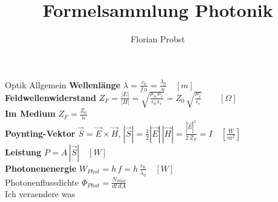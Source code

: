 \documentclass[8pt]{scrartcl}
\author{Florian Probst}
\title{Formelsammlung Photonik}
\begin{document}
	\begin{section}{Optik Allgemein}
		\textbf{Wellenlänge} $\lambda=\frac{c_0}{f\, n} = \frac{\lambda_0}{n}\quad[m]$\\[.2cm]
		\textbf{Feldwellenwiderstand} $Z_F=\frac{|E|}{|H|}=\sqrt{\frac{\mu_0 \, \mu_r}{\epsilon_0 \, \epsilon_r}}= Z_0 \, \sqrt{\frac{\mu_r}{\epsilon_r}} \qquad[\Omega]$\\[.2cm]
		\textbf{Im Medium} $Z_F = \frac{Z_0}{n}$\\[.2cm]
		\textbf{Poynting-Vektor} $\vec{S}=\vec{E}\times\vec{H}$, $|\vec{S}|=\frac{1}{2}|\vec{E}|\,|\vec{H}|=\frac{|\vec{E}|^2}{2\,Z_F}=I\quad [\frac{W}{m^2}]$\\[.2cm]
		\textbf{Leistung} $P= A\, |\vec{S}|\quad [W]$ \\[.2cm]
		\textbf{Photonenenergie} $W_{Phot}= h\,f=h\, \frac{c_0}{\lambda_0}\quad [W]$\\[.2cm]
		Photonenflussdichte $\Phi_{Phot}=\frac{N_{Phot}}{dt\,dA}$ \\
		Ich veraendere was
		
	\end{section}
\end{document}
